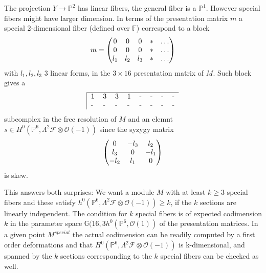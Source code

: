 \documentclass[12pt,leqno]{amsart}
\newcommand{\FF}{{\mathbb F}}
\newcommand{\GG}{{\mathbb G}}
\newcommand{\PP}{{\mathbb P}}
\newcommand{\kf}{{\mathcal F}}
\newcommand{\ko}{{\mathcal O}}
\newcommand{\tensor}{\otimes}
\begin{document}
The projection $Y \to \PP^2$ has linear fibers, the general fiber is a 
$\PP^1$. However special fibers might have larger dimension. In terms
of the presentation matrix $m$ a special 2-dimensional fiber (defined
over $\FF$) correspond to a block
$$
m=\begin{pmatrix}
0 & 0 & 0 & * & \ldots \cr
0 & 0 & 0 & * & \ldots \cr
l_1 & l_2 & l_3 & *& \ldots \cr 
\end{pmatrix}
$$
with $l_1,l_2,l_3$ 3 linear forms, in the $3\times16$ presentation matrix of $M$.
Such block gives a 
$$
\begin{tabular}{|llllllll}
\hline
1 & 3 & 3 & 1 & - & - & - &- \cr
- & - & - & - & - & - & - & - \cr
\end{tabular}
$$
subcomplex in the free resolution of $M$ and an elemnt 
$s \in H^0(\PP^6,\Lambda^2 \kf \tensor \ko(-1))$
since the syzygy matrix
$$
\begin{pmatrix}
0 & -l_3 & l_2  \cr
l_3 & 0 & -l_1  \cr
-l_2 & l_1 & 0  \cr 
\end{pmatrix}
$$
is skew. 

This answers both surprises: 
We want a module $M$ with at least $k \ge 3$ special
fibers and these satisfy $h^0(\PP^6,\Lambda^2 \kf \tensor \ko(-1)) \ge k$, 
if the $k$ sections are linearly independent. 
The condition for $k$ special fibers is of expected codimension $k$ in the
parameter space $\GG(16,3h^0(\PP^6,\ko(1))$ of the presentation matrices.
In a given point $M^{special}$ the actual codimension can be readily computed
by a first order deformations and that 
$H^0(\PP^6,\Lambda^2 \kf \tensor \ko(-1))$ is k-dimensional, and spanned by the
$k$ sections corresponding to the $k$ special fibers can be checked as well. 
\end{document}
